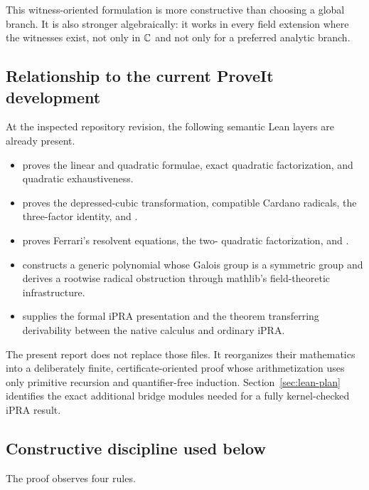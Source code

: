 This witness-oriented formulation is more constructive than choosing a global
branch.  It is also stronger algebraically: it works in every field extension
where the witnesses exist, not only in $\mathbb C$ and not only for a preferred
analytic branch.

\subsection{Relationship to the current ProveIt development}

At the inspected repository revision, the following semantic Lean layers are
already present.

\begin{itemize}
\item {}
  proves the linear and quadratic formulae, exact quadratic factorization, and
  quadratic exhaustiveness.
\item {} proves the depressed-cubic transformation, compatible
  Cardano radicals, the three-factor identity, and
  .
\item {} proves Ferrari's resolvent equations, the two-
  quadratic factorization, and .
\item {} constructs a generic polynomial whose
  Galois group is a symmetric group and derives a rootwise radical
  obstruction through mathlib's field-theoretic infrastructure.
\item {} supplies the
  formal iPRA presentation and the theorem  transferring
  derivability between the native calculus and ordinary iPRA.
\end{itemize}

The present report does not replace those files.  It reorganizes their
mathematics into a deliberately finite, certificate-oriented proof whose
arithmetization uses only primitive recursion and quantifier-free induction.
Section~\ref{sec:lean-plan} identifies the exact additional bridge modules
needed for a fully kernel-checked iPRA result.

\subsection{Constructive discipline used below}

The proof observes four rules.

